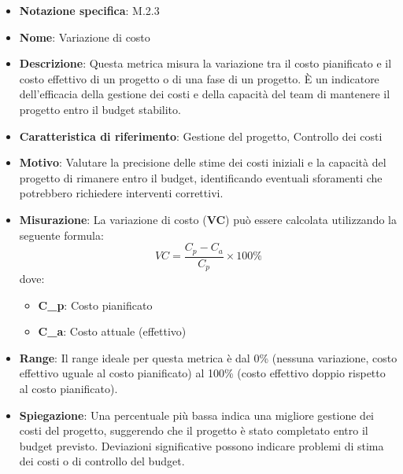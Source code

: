 \begin{itemize}
    \item \textbf{Notazione specifica}: M.2.3
    \item \textbf{Nome}: Variazione di costo
    \item \textbf{Descrizione}: Questa metrica misura la variazione tra il costo pianificato e il costo effettivo di un progetto o di una fase di un progetto. È un indicatore dell'efficacia della gestione dei costi e della capacità del team di mantenere il progetto entro il budget stabilito.
    \item \textbf{Caratteristica di riferimento}: Gestione del progetto, Controllo dei costi
    \item \textbf{Motivo}: Valutare la precisione delle stime dei costi iniziali e la capacità del progetto di rimanere entro il budget, identificando eventuali sforamenti che potrebbero richiedere interventi correttivi.
    \item \textbf{Misurazione}: La variazione di costo (\textbf{VC}) può essere calcolata utilizzando la seguente formula:
    \[ VC = \frac{C_p - C_a}{C_p} \times 100\% \]
    dove:
    \begin{itemize}
        \item \textbf{C_p}: Costo pianificato
        \item \textbf{C_a}: Costo attuale (effettivo)
    \end{itemize}
    \item \textbf{Range}: Il range ideale per questa metrica è dal 0\% (nessuna variazione, costo effettivo uguale al costo pianificato) al 100\% (costo effettivo doppio rispetto al costo pianificato).
    \item \textbf{Spiegazione}: Una percentuale più bassa indica una migliore gestione dei costi del progetto, suggerendo che il progetto è stato completato entro il budget previsto. Deviazioni significative possono indicare problemi di stima dei costi o di controllo del budget.
\end{itemize}
